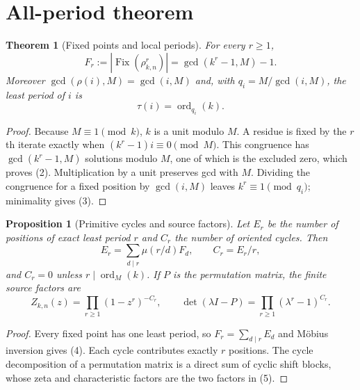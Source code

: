 \documentclass[10pt]{article}
\newtheorem{theorem}{Theorem}
\newtheorem{proposition}{Proposition}
\begin{document}
\section{All-period theorem}
\begin{theorem}[Fixed points and local periods]\label{thm:atlas}
For every $r\ge1$,
\begin{equation}
 F_r:=|\operatorname{Fix}(\rho_{k,n}^r)|=\gcd(k^r-1,M)-1.               \tag{2}
\end{equation}
Moreover $\gcd(\rho(i),M)=\gcd(i,M)$ and, with
$q_i=M/\gcd(i,M)$, the least period of $i$ is
\begin{equation}
 \tau(i)=\operatorname{ord}_{q_i}(k).                                  \tag{3}
\end{equation}
\end{theorem}
\begin{proof}
Because $M\equiv1\pmod k$, $k$ is a unit modulo $M$.  A residue is fixed by
the $r$th iterate exactly when $(k^r-1)i\equiv0\pmod M$.  This congruence has
$\gcd(k^r-1,M)$ solutions modulo $M$, one of which is the excluded zero,
which proves (2).  Multiplication by a unit preserves gcd with $M$.  Dividing
the congruence for a fixed position by $\gcd(i,M)$ leaves
$k^r\equiv1\pmod{q_i}$; minimality gives (3).
\end{proof}

\begin{proposition}[Primitive cycles and source factors]\label{prop:zeta}
Let $E_r$ be the number of positions of exact least period $r$ and $C_r$ the
number of oriented cycles.  Then
\begin{equation}
 E_r=\sum_{d\mid r}\mu(r/d)F_d,\qquad C_r=E_r/r,                         \tag{4}
\end{equation}
and $C_r=0$ unless $r\mid\operatorname{ord}_M(k)$.  If $P$ is the permutation
matrix, the finite source factors are
\begin{equation}
 Z_{k,n}(z)=\prod_{r\ge1}(1-z^r)^{-C_r},\qquad
 \det(\lambda I-P)=\prod_{r\ge1}(\lambda^r-1)^{C_r}.                  \tag{5}
\end{equation}
\end{proposition}
\begin{proof}
Every fixed point has one least period, so $F_r=\sum_{d\mid r}E_d$ and
Möbius inversion gives (4).  Each cycle contributes exactly $r$ positions.
The cycle decomposition of a permutation matrix is a direct sum of cyclic
shift blocks, whose zeta and characteristic factors are the two factors in
(5).
\end{proof}
\end{document}
